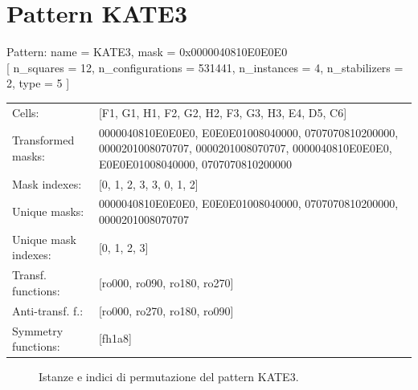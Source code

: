\newpage

\section{Pattern KATE3}

\begin{tcolorbox}[sharp corners, fontupper=\ttfamily\small, colback=white]
  \noindent Pattern: name = KATE3, mask = 0x0000040810E0E0E0\\
  {[} n\_squares = 12, n\_configurations = 531441,
  n\_instances = 4, n\_stabilizers = 2, type = 5 { ]}\\[1.0ex]
  \begin{tabularx}{\textwidth}{@{} p{3.5cm} X @{}}
    Cells:               & {[}F1, G1, H1, F2, G2, H2, F3, G3, H3, E4, D5, C6{]}\\[0.5ex]
    Transformed masks:   & 0000040810E0E0E0, E0E0E01008040000, 0707070810200000, 0000201008070707, 0000201008070707, 0000040810E0E0E0, E0E0E01008040000, 0707070810200000\\[0.5ex]
    Mask indexes:        & {[}0, 1, 2, 3, 3, 0, 1, 2{]}\\[0.5ex]
    Unique masks:        & 0000040810E0E0E0, E0E0E01008040000, 0707070810200000, 0000201008070707\\[0.5ex]
    Unique mask indexes: & {[}0, 1, 2, 3{]}\\[0.5ex]
    Transf. functions:   & {[}ro000, ro090, ro180, ro270{]}\\[0.5ex]
    Anti-transf. f.:     & {[}ro000, ro270, ro180, ro090{]}\\[0.5ex]
    Symmetry functions:  & {[}fh1a8{]}\\[0.5ex]
  \end{tabularx}
\end{tcolorbox}

\begin{figure}[htbp]
  \centering
   \hfill
   \hfill
   \hfill
  \vspace{0.3cm}
   \hfill
   \hfill
   \hfill
  \caption{Istanze e indici di permutazione del pattern KATE3.}
\end{figure}

